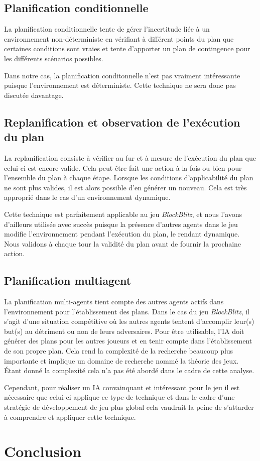 \documentclass[12pt,english,frenchb,letterpaper]{article}
\begin{document}
\subsection{Planification conditionnelle}
La planification conditionnelle tente de gérer l'incertitude liée à un environnement non-déterministe en vérifiant à différent points du plan que certaines conditions sont vraies et tente d'apporter un plan de contingence pour les différents scénarios possibles.

Dans notre cas, la planification conditonnelle n'est pas vraiment intéressante puisque l'environnement est déterministe.  Cette technique ne sera donc pas discutée davantage.

\subsection{Replanification et observation de l'exécution du plan}
La replanification consiste à vérifier au fur et à mesure de l'exécution du plan que celui-ci est encore valide.  Cela peut être fait une action à la fois ou bien pour l'ensemble du plan à chaque étape.  Lorsque les conditions d'applicabilité du plan ne sont plus valides, il est alors possible d'en générer un nouveau. Cela est très approprié dans le cas d'un environnement dynamique.

Cette technique est parfaitement applicable au jeu \textit{BlockBlitz}, et nous l'avons d'ailleurs utilisée avec succès puisque la présence d'autres agents dans le jeu modifie l'environnement pendant l'exécution du plan, le rendant dynamique.  Nous validons à chaque tour la validité du plan avant de fournir la prochaine action.

\subsection{Planification multiagent}

La planification multi-agents tient compte des autres agents actifs dans l'environnement pour l'établissement des plans.  Dans le cas du jeu \textit{BlockBlitz}, il s'agit d'une situation compétitive où les autres agents tentent d'accomplir leur(s) but(s) au détriment ou non de leurs adversaires.  Pour être utilisable, l'IA doit générer des plans pour les autres joueurs et en tenir compte dans l'établissement de son propre plan.  Cela rend la complexité de la recherche beaucoup plus importante et implique un domaine de recherche nommé la théorie des jeux.  Étant donné la complexité cela n'a pas été abordé dans le cadre de cette analyse.  

Cependant, pour réaliser un IA convainquant et intéressant pour le jeu il est nécessaire que celui-ci applique ce type de technique et dans le cadre d'une stratégie de développement de jeu plus global cela vaudrait la peine de s'attarder à comprendre et appliquer cette technique.


\section{Conclusion}
\end{document}

